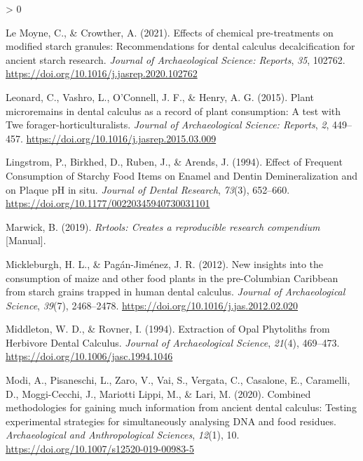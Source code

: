 \documentclass[
]{article}
\newlength{\cslhangindent}
\newenvironment{CSLReferences}[2] %
 {%
  \setlength{\parindent}{0pt}
  \ifodd #1 \everypar{\setlength{\hangindent}{\cslhangindent}}\ignorespaces\fi
  \ifnum #2 > 0
  \setlength{\parskip}{#2\baselineskip}
  \fi
 }%
 {}
\begin{document}
\begin{CSLReferences}{1}{0}
\leavevmode\hypertarget{ref-lemoyneCalculusPretreatments2021}{}%
Le Moyne, C., \& Crowther, A. (2021). Effects of chemical pre-treatments on modified starch granules: Recommendations for dental calculus decalcification for ancient starch research. \emph{Journal of Archaeological Science: Reports}, \emph{35}, 102762. \url{https://doi.org/10.1016/j.jasrep.2020.102762}

\leavevmode\hypertarget{ref-leonardDentalCalculus2015}{}%
Leonard, C., Vashro, L., O'Connell, J. F., \& Henry, A. G. (2015). Plant microremains in dental calculus as a record of plant consumption: A test with {Twe} forager-horticulturalists. \emph{Journal of Archaeological Science: Reports}, \emph{2}, 449--457. \url{https://doi.org/10.1016/j.jasrep.2015.03.009}

\leavevmode\hypertarget{ref-lingstromStarchyFood1994}{}%
Lingstrom, P., Birkhed, D., Ruben, J., \& Arends, J. (1994). Effect of {Frequent Consumption} of {Starchy Food Items} on {Enamel} and {Dentin Demineralization} and on {Plaque pH} in situ. \emph{Journal of Dental Research}, \emph{73}(3), 652--660. \url{https://doi.org/10.1177/00220345940730031101}

\leavevmode\hypertarget{ref-R-rrtools}{}%
Marwick, B. (2019). \emph{Rrtools: Creates a reproducible research compendium} {[}Manual{]}.

\leavevmode\hypertarget{ref-mickleburghNewInsightsConsumption2012}{}%
Mickleburgh, H. L., \& Pagán-Jiménez, J. R. (2012). New insights into the consumption of maize and other food plants in the pre-{Columbian Caribbean} from starch grains trapped in human dental calculus. \emph{Journal of Archaeological Science}, \emph{39}(7), 2468--2478. \url{https://doi.org/10.1016/j.jas.2012.02.020}

\leavevmode\hypertarget{ref-middletonExtractionOpalPhytoliths1994}{}%
Middleton, W. D., \& Rovner, I. (1994). Extraction of {Opal Phytoliths} from {Herbivore Dental Calculus}. \emph{Journal of Archaeological Science}, \emph{21}(4), 469--473. \url{https://doi.org/10.1006/jasc.1994.1046}

\leavevmode\hypertarget{ref-modiCalculusMethodologies2020}{}%
Modi, A., Pisaneschi, L., Zaro, V., Vai, S., Vergata, C., Casalone, E., Caramelli, D., Moggi-Cecchi, J., Mariotti Lippi, M., \& Lari, M. (2020). Combined methodologies for gaining much information from ancient dental calculus: Testing experimental strategies for simultaneously analysing {DNA} and food residues. \emph{Archaeological and Anthropological Sciences}, \emph{12}(1), 10. \url{https://doi.org/10.1007/s12520-019-00983-5}


\end{CSLReferences}
\end{document}
